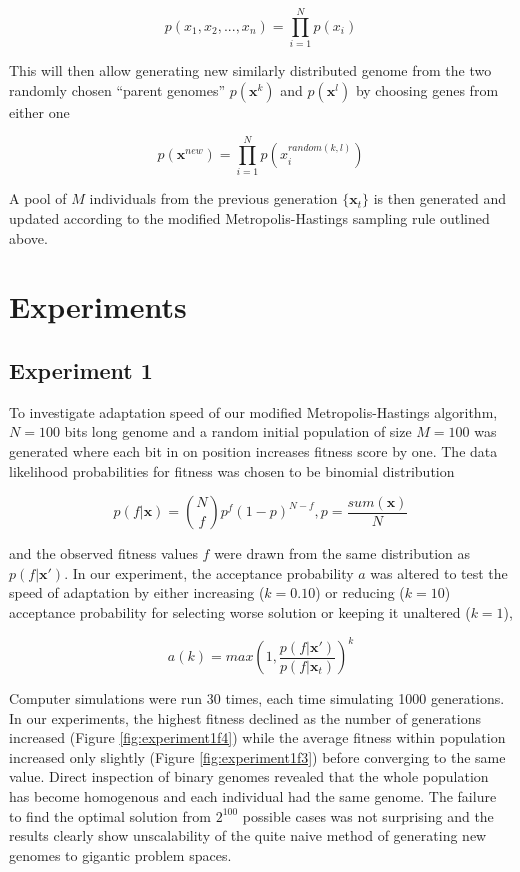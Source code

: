 \documentclass{article}
\begin{document}
\begin{equation}
  p(x_1,x_2,...,x_n)=\prod_{i=1}^{N}p(x_i)
\end{equation}

This will then allow generating new similarly distributed genome from the two randomly chosen ``parent genomes'' $p(\mathbf{x}^k)$ and $p(\mathbf{x}^l)$ by choosing genes from either one

\begin{equation}
  p(\mathbf{x}^{new})=\prod_{i=1}^{N}p(x_i^{random(k,l)})
\end{equation}

A pool of $M$ individuals from the previous generation $\{\mathbf{x}_t\}$ is then generated and updated according to the modified Metropolis-Hastings sampling rule outlined above.


\section{Experiments} \label{experiments}

\subsection{Experiment 1}

To investigate adaptation speed of our modified Metropolis-Hastings algorithm, $N=100$ bits long genome and a random initial population of size $M=100$ was generated where each bit in on position increases fitness score by one. The data likelihood probabilities for fitness was chosen to be binomial distribution 

\begin{equation}
  p(f|\mathbf{x}) = \binom{N}{f} p^{f}(1-p)^{N-f}, p = \frac{sum(\mathbf{x})}{N}
\end{equation}

and the observed fitness values $f$ were drawn from the same distribution as $p(f|\mathbf{x}')$. In our experiment, the acceptance probability $a$ was altered to test the speed of adaptation by either increasing ($k=0.10$) or reducing ($k=10$) acceptance probability for selecting worse solution or keeping it unaltered ($k=1$), 

\begin{equation}
  \label{mcmcsampling3}
  a(k) = max(1, \frac{p(f|\mathbf{x}')}{p(f|\mathbf{x}_t)})^{k}
\end{equation}

Computer simulations were run 30 times, each time simulating 1000 generations. In our experiments, the highest fitness declined as the number of generations increased (Figure \ref{fig:experiment1f4}) while the average fitness within population increased only slightly (Figure \ref{fig:experiment1f3}) before converging to the same value. Direct inspection of binary genomes revealed that the whole population has become homogenous and each individual had the same genome. The failure to find the optimal solution from $2^{100}$ possible cases was not surprising and the results clearly show unscalability of the quite naive method of generating new genomes to gigantic problem spaces.
\end{document}
